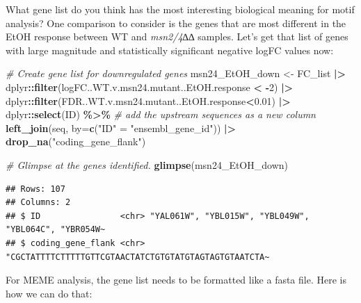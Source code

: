 \documentclass[
]{book}
\newenvironment{Shaded}{\begin{snugshade}}{\end{snugshade}}
\newcommand{\AttributeTok}[1]{\textcolor[rgb]{0.13,0.29,0.53}{#1}}
\newcommand{\CommentTok}[1]{\textcolor[rgb]{0.56,0.35,0.01}{\textit{#1}}}
\newcommand{\DecValTok}[1]{\textcolor[rgb]{0.00,0.00,0.81}{#1}}
\newcommand{\FloatTok}[1]{\textcolor[rgb]{0.00,0.00,0.81}{#1}}
\newcommand{\FunctionTok}[1]{\textcolor[rgb]{0.13,0.29,0.53}{\textbf{#1}}}
\newcommand{\NormalTok}[1]{#1}
\newcommand{\OtherTok}[1]{\textcolor[rgb]{0.56,0.35,0.01}{#1}}
\newcommand{\SpecialCharTok}[1]{\textcolor[rgb]{0.81,0.36,0.00}{\textbf{#1}}}
\newcommand{\StringTok}[1]{\textcolor[rgb]{0.31,0.60,0.02}{#1}}
\begin{document}
What gene list do you think has the most interesting biological meaning
for motif analysis? One comparison to consider is the genes that are
most different in the EtOH response between WT and \emph{msn2/4}∆∆ samples.
Let's get that list of genes with large magnitude and statistically
significant negative logFC values now:

\begin{Shaded}
\begin{Highlighting}[]
\CommentTok{\# Create gene list for downregulated genes}
\NormalTok{msn24\_EtOH\_down }\OtherTok{\textless{}{-}}\NormalTok{ FC\_list }\SpecialCharTok{|\textgreater{}}
\NormalTok{  dplyr}\SpecialCharTok{::}\FunctionTok{filter}\NormalTok{(logFC..WT.v.msn24.mutant..EtOH.response }\SpecialCharTok{\textless{}} \SpecialCharTok{{-}}\DecValTok{2}\NormalTok{) }\SpecialCharTok{|\textgreater{}}
\NormalTok{  dplyr}\SpecialCharTok{::}\FunctionTok{filter}\NormalTok{(FDR..WT.v.msn24.mutant..EtOH.response}\SpecialCharTok{\textless{}}\FloatTok{0.01}\NormalTok{) }\SpecialCharTok{|\textgreater{}}
\NormalTok{  dplyr}\SpecialCharTok{::}\FunctionTok{select}\NormalTok{(ID) }\SpecialCharTok{\%\textgreater{}\%}
  \CommentTok{\# add the upstream sequences as a new column}
  \FunctionTok{left\_join}\NormalTok{(seq, }\AttributeTok{by=}\FunctionTok{c}\NormalTok{(}\StringTok{"ID"} \OtherTok{=} \StringTok{"ensembl\_gene\_id"}\NormalTok{)) }\SpecialCharTok{|\textgreater{}}
  \FunctionTok{drop\_na}\NormalTok{(}\StringTok{"coding\_gene\_flank"}\NormalTok{)}

\CommentTok{\# Glimpse at the genes identified.}
\FunctionTok{glimpse}\NormalTok{(msn24\_EtOH\_down)}
\end{Highlighting}
\end{Shaded}

\begin{verbatim}
## Rows: 107
## Columns: 2
## $ ID                <chr> "YAL061W", "YBL015W", "YBL049W", "YBL064C", "YBR054W~
## $ coding_gene_flank <chr> "CGCTATTTTCTTTTTGTTCGTAACTATCTGTGTATGTAGTAGTGTAATCTA~
\end{verbatim}

For MEME analysis, the gene list needs to be formatted like a fasta
file. Here is how we can do that:

\begin{Shaded}
\end{Shaded}
\end{document}
